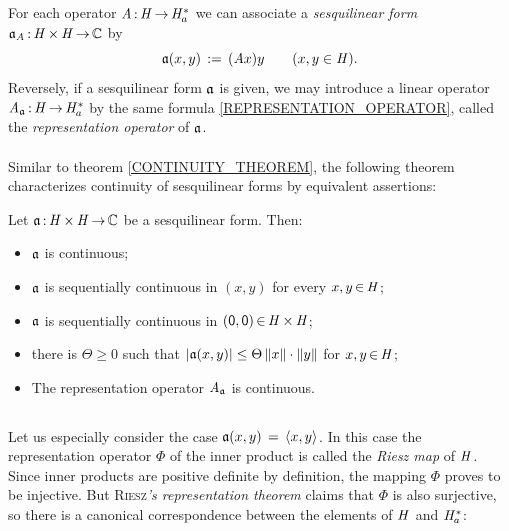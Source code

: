 \documentclass[11pt,twoside]{article}
\begin{document}
\begin{itemize}[leftmargin=4mm]
\subparagraph{} %
For each operator $\mathit{A} {\,:\,} \mathit{H} {\,\to\,} \mathit{H}_a^*$
we can associate a \textit{sesquilinear form}
$\mathfrak{a}_{\mathit{A}} {\,:\,} \mathit{H} {\,\times\,} \mathit{H} {\,\to\,} {\mathbb{C}}$ by
\begin{equation}\label{REPRESENTATION_OPERATOR}
\mathfrak{a}(x,y) \,:=\, (\mathit{A} x)y
\quad \quad (x,y \in \mathit{H}).
\end{equation}
Reversely,
if a sesquilinear form $\mathfrak{a}$ is given,
we may introduce a linear operator
$\mathit{A}_{\mathfrak{a}} {\,:\,} \mathit{H} {\,\to\,} \mathit{H}_a^*$
by the same formula \eqref{REPRESENTATION_OPERATOR},
called the \textit{representation operator} of $\mathfrak{a}$.

\paragraph{} %
Similar to theorem \ref{CONTINUITY_THEOREM},
the following theorem characterizes continuity of sesquilinear forms
by equivalent assertions:

\begin{theorem}
Let $\mathfrak{a} {\,:\,} \mathit{H} {\,\times\,} \mathit{H} {\,\to\,} {\mathbb{C}}$ be a sesquilinear form.
Then:

\begin{itemize}[leftmargin=9mm]
\item[(a)]
$\mathfrak{a}$ is continuous;
\item[(b)]
$\mathfrak{a}$ is sequentially continuous in $(x,y)$ for every $x,y {\,\in\,} \mathit{H}$;
\item[(c)]
$\mathfrak{a}$ is sequentially continuous in $({\mathsf{0}},{\mathsf{0}}) {\,\in\,} \mathit{H} {\,\times\,} \mathit{H}$;
\item[(d)]
there is $\Theta \geq 0$ such that
$\abs{\sql(x,y)} \leq \Theta \norm{x} \cdot \norm{y}$ for $x,y {\,\in\,} \mathit{H}$;
\item[(e)]
The representation operator $\mathit{A}_{\mathfrak{a}}$ is continuous.
\end{itemize}
\end{theorem}
\end{itemize}

\subsection{} %
Let us especially consider the case $\mathfrak{a}(x,y) \,=\, \langle x,y \rangle$.
In this case the representation operator $\Phi$
of the inner product is called the \textit{Riesz map} of $\mathit{H}$.
Since inner products are positive definite by definition,
the mapping $\Phi$ proves to be injective.
But \textsc{Riesz}\textit{'s representation theorem} claims
that $\Phi$ is also surjective,
so there is a canonical correspondence
between the elements of $\mathit{H}$ and $\mathit{H}_a^*$:
\end{document}

